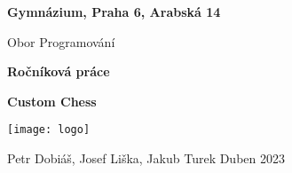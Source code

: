 \begin{titlepage}
\begin{center}
    \vspace{2,5cm}
    \textbf{\Large Gymnázium, Praha 6, Arabská 14}\par
    \Large Obor Programování\par
    \vspace{2cm}
    \textbf{\Huge Ročníková práce}\par
    \vspace{2cm}
    \textbf{\Huge Custom Chess}\par
    \vspace{2cm}
    \texttt{[image: logo]}\par
    \vfill
   \Large Petr Dobiáš, Josef Liška, Jakub Turek \hfill Duben 2023
   
    
     
\end{center}
\end{titlepage}